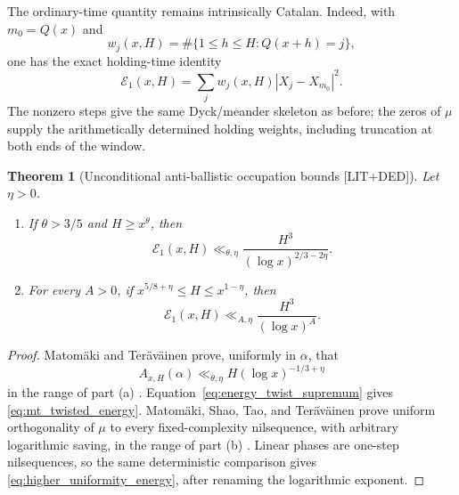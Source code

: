 \documentclass[11pt]{amsart}
\numberwithin{equation}{section}
\theoremstyle{plain}
\newtheorem{theorem}{Theorem}[section]
\theoremstyle{definition}
\theoremstyle{remark}
\newcommand{\Mob}{\mu}
\begin{document}
The ordinary-time quantity remains intrinsically Catalan.  Indeed, with
$m_0=Q(x)$ and
\begin{equation}
 w_j(x,H)=\#\{1\leq h\leq H:Q(x+h)=j\},
\end{equation}
one has the exact holding-time identity
\begin{equation}
 \boxed{\;
 \mathcal E_1(x,H)
 =\sum_jw_j(x,H)|X_j-X_{m_0}|^2.\;}
\label{eq:weighted_compressed_energy}
\end{equation}
The nonzero steps give the same Dyck/meander skeleton as before; the zeros of
$\Mob$ supply the arithmetically determined holding weights, including
truncation at both ends of the window.

\begin{theorem}[Unconditional anti-ballistic occupation bounds
\textnormal{[LIT+DED]}]
\label{thm:unconditional_antiballistic_energy}
Let $\eta>0$.
\begin{enumerate}[label=(\alph*)]
\item If $\theta>3/5$ and $H\geq x^\theta$, then
\begin{equation}
 \mathcal E_1(x,H)
 \ll_{\theta,\eta}
 \frac{H^3}{(\log x)^{2/3-2\eta}}.
\label{eq:mt_twisted_energy}
\end{equation}
\item For every $A>0$, if
$x^{5/8+\eta}\leq H\leq x^{1-\eta}$, then
\begin{equation}
 \mathcal E_1(x,H)
 \ll_{A,\eta}\frac{H^3}{(\log x)^A}.
\label{eq:higher_uniformity_energy}
\end{equation}
\end{enumerate}
\end{theorem}

\begin{proof}
Matom\"aki and Ter\"av\"ainen prove, uniformly in $\alpha$, that
\begin{equation}
 A_{x,H}(\alpha)
 \ll_{\theta,\eta}H(\log x)^{-1/3+\eta}
\end{equation}
in the range of part (a) \cite[Theorem~1.5]{MatomakiTeravainen2023}.
Equation~\eqref{eq:energy_twist_supremum} gives
\eqref{eq:mt_twisted_energy}.  Matom\"aki, Shao, Tao, and Ter\"av\"ainen prove
uniform orthogonality of $\Mob$ to every fixed-complexity nilsequence, with
arbitrary logarithmic saving, in the range of part (b)
\cite{MatomakiShaoTaoTeravainen2023}.  Linear phases are one-step
nilsequences, so the same deterministic comparison gives
\eqref{eq:higher_uniformity_energy}, after renaming the logarithmic exponent.
\end{proof}
\end{document}
